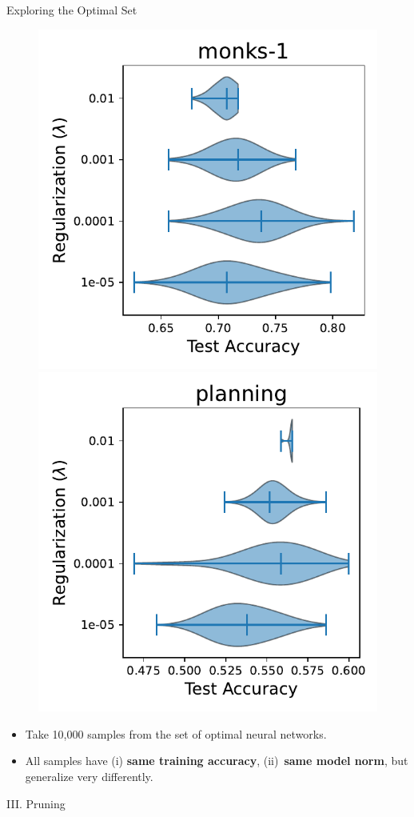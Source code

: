 \documentclass[usenames,dvipsnames,mathserif,notheorems]{beamer}
\begin{document}
\begin{frame}{Exploring the Optimal Set}

	\begin{figure}[t]
		\centering
		\includegraphics[width=0.48\linewidth]{assets/dist_paper_monks-1.pdf}
		\includegraphics[width=0.48\linewidth]{assets/dist_paper_planning.pdf}
	\end{figure}
	\begin{itemize}
		\item Take 10,000 samples from the set of optimal neural networks.
		\item All samples have (i) \textbf{same training accuracy},
		      (ii)~\textbf{same model norm}, but generalize very differently.
	\end{itemize}
\end{frame}



\begin{frame}{}
	\begin{center}
		\huge III. Pruning
	\end{center}
\end{frame}
\end{document}

